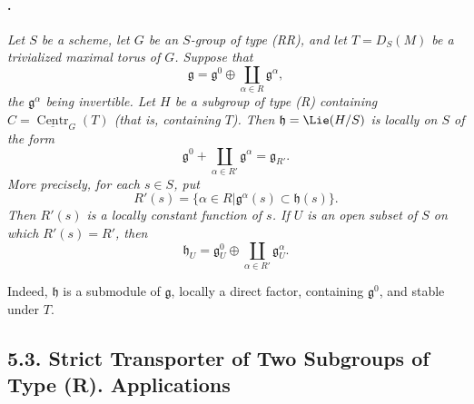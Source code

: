 \paragraph{.}
\textit{Let \(S\) be a scheme, let \(G\) be an \(S\)-group of type
\textup{(RR)}, and let \(T=D_S(M)\) be a trivialized maximal torus
of \(G\). Suppose that}
\[
  \mathfrak g
  =
  \mathfrak g^0
  \oplus
  \coprod_{\alpha\in R}\mathfrak g^\alpha,
\]
\textit{the \(\mathfrak g^\alpha\) being invertible. Let \(H\) be a subgroup of type
\textup{(R)} containing
\(C=\underline{\operatorname{Centr}}_G(T)\)
\textup{(that is, containing \(T\))}. Then
\(\mathfrak h=\Lie(H/S)\) is locally on \(S\) of the form}
\[
  \mathfrak g^0
  +
  \coprod_{\alpha\in R'}\mathfrak g^\alpha
  =
  \mathfrak g_{R'}.
\]
\textit{More precisely, for each \(s\in S\), put}
\[
  R'(s)
  =
  \bigl\{
    \alpha\in R
    \mathrel{\big|}
    \mathfrak g^\alpha(s)\subset\mathfrak h(s)
  \bigr\}.
\]
\textit{Then \(R'(s)\) is a locally constant function of \(s\). If
\(U\) is an open subset of \(S\) on which \(R'(s)=R'\), then}
\[
  \mathfrak h_U
  =
  \mathfrak g_U^0
  \oplus
  \coprod_{\alpha\in R'}\mathfrak g_U^\alpha.
\]

Indeed, \(\mathfrak h\) is a submodule of \(\mathfrak g\), locally
a direct factor, containing \(\mathfrak g^0\), and stable under
\(T\).

\subsection*{5.3. Strict Transporter of Two Subgroups of Type
\textup{(R)}. Applications}

